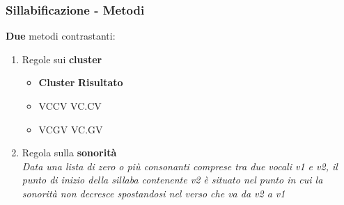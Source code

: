 \begin{frame}
\frametitle{Sillabificazione - Metodi}
   \textbf{Due} metodi contrastanti:
       \begin{enumerate}
         \item Regole sui \textbf{cluster} 
          \begin{itemize}
             \item \textbf{Cluster} \qquad \quad \textbf{Risultato}
             \item VCCV \qquad \qquad VC.CV
             \item VCGV \qquad \qquad VC.GV
          \end{itemize}     
         \item Regola sulla \textbf{sonorità} \\
           \textit{Data una lista di zero o più consonanti comprese tra due vocali v1 e v2, 
                   il punto di inizio della sillaba
                   contenente v2 è situato nel punto in cui la sonorità non decresce spostandosi nel verso che va da v2
                   a v1}
       \end{enumerate}    
\end{frame}
